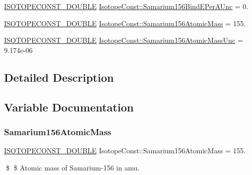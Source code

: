 \begin{DoxyCompactItemize}
\mbox{\hyperlink{group___isotope_const-_macros_ga8f45a7272ce02c0b4c65c44636ed719a}{I\+S\+O\+T\+O\+P\+E\+C\+O\+N\+S\+T\+\_\+\+D\+O\+U\+B\+LE}} \mbox{\hyperlink{group___isotope_const-_samarium-_sm156_ga7c4c98158d29a0b91506f632442d9bec}{Isotope\+Const\+::\+Samarium156\+Bind\+E\+Per\+A\+Unc}} = 0.
\item 
\mbox{\hyperlink{group___isotope_const-_macros_ga8f45a7272ce02c0b4c65c44636ed719a}{I\+S\+O\+T\+O\+P\+E\+C\+O\+N\+S\+T\+\_\+\+D\+O\+U\+B\+LE}} \mbox{\hyperlink{group___isotope_const-_samarium-_sm156_gaa0c523783c287c959ff9353c941bb616}{Isotope\+Const\+::\+Samarium156\+Atomic\+Mass}} = 155.
\item 
\mbox{\hyperlink{group___isotope_const-_macros_ga8f45a7272ce02c0b4c65c44636ed719a}{I\+S\+O\+T\+O\+P\+E\+C\+O\+N\+S\+T\+\_\+\+D\+O\+U\+B\+LE}} \mbox{\hyperlink{group___isotope_const-_samarium-_sm156_gab41e528e400d950c9c95becd01618c08}{Isotope\+Const\+::\+Samarium156\+Atomic\+Mass\+Unc}} = 9.\+174e-\/06
\end{DoxyCompactItemize}


\subsection{Detailed Description}


\subsection{Variable Documentation}
\mbox{\label{group___isotope_const-_samarium-_sm156_gaa0c523783c287c959ff9353c941bb616}} 
\subsubsection{\texorpdfstring{Samarium156\+Atomic\+Mass}{Samarium156AtomicMass}}
{\footnotesize\ttfamily \mbox{\hyperlink{group___isotope_const-_macros_ga8f45a7272ce02c0b4c65c44636ed719a}{I\+S\+O\+T\+O\+P\+E\+C\+O\+N\+S\+T\+\_\+\+D\+O\+U\+B\+LE}} Isotope\+Const\+::\+Samarium156\+Atomic\+Mass = 155.}

\$ \$ Atomic mass of Samarium-\/156 in amu. \mbox{\label{group___isotope_const-_samarium-_sm156_gab41e528e400d950c9c95becd01618c08}} 
